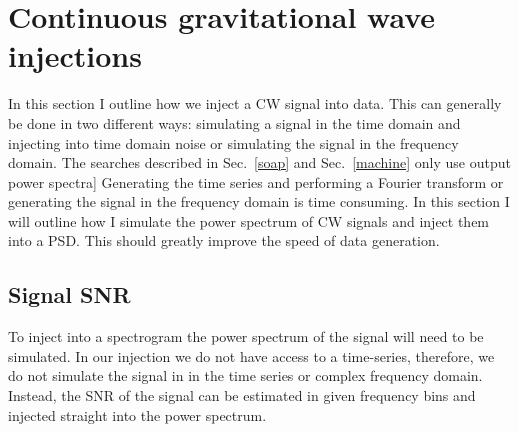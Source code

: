 \chapter{\label{app1}Continuous gravitational wave injections}

In this section I outline how we inject a \gls{CW} signal into data. This can generally be done in two different ways: simulating a signal in the time domain and injecting into time domain noise or simulating the signal in the frequency domain. 
The searches described in Sec.~\ref{soap} and Sec.~\ref{machine} only use output power spectra] 
Generating the time series and performing a Fourier transform or generating the signal in the frequency domain is time consuming. 
In this section I will outline how I simulate the power spectrum of \gls{CW} signals and inject them into a \gls{PSD}.
This should greatly improve the speed of data generation.


\section{Signal SNR}

To inject into a spectrogram the power spectrum of the signal will need to be simulated. In our injection we do not have access to a time-series, therefore, we do not simulate the signal in in the time series or complex frequency domain. 
Instead, the \gls{SNR} of the signal can be estimated in given frequency bins and injected straight into the power spectrum.

